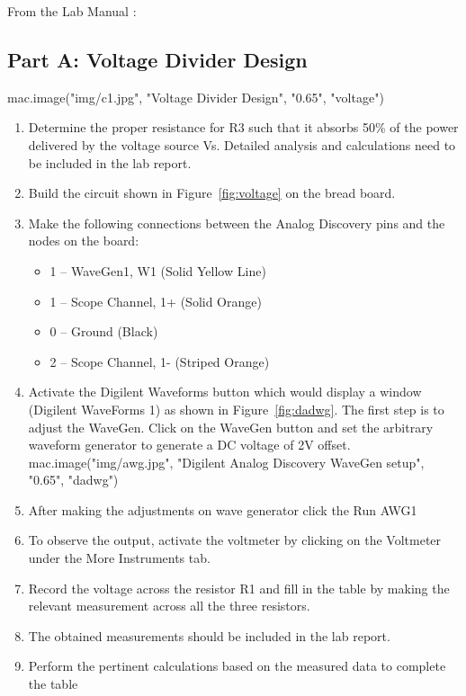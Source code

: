 {%

From the Lab Manual \cite{manual} :
\subsection{Part A: Voltage Divider Design}
\label{sub:Procedure Part A}
{{ mac.image("img/c1.jpg", "Voltage Divider Design", "0.65", "voltage")}}
\begin{enumerate}
  Build a voltage divider that satisfies the given power requirements using the circuit
  given in Figure~\ref{fig:voltage}  Given, R1= 1 kΩ, R2 = 1.5 kΩ.
  \item Determine the proper resistance for R3 such that it absorbs 50\% of the power delivered by
  the voltage source Vs. Detailed analysis and calculations need to be included in the lab
  report.
  \item Build the circuit shown in Figure~\ref{fig:voltage}  on the bread board.
  \item Make the following connections between the Analog Discovery pins and the nodes on the
  board:
  \begin{itemize}
    \item 1 – WaveGen1, W1 (Solid Yellow Line)
    \item 1 – Scope Channel, 1+ (Solid Orange)
    \item 0 – Ground (Black)
    \item 2 – Scope Channel, 1- (Striped Orange)
  \end{itemize}
  \item Activate the Digilent Waveforms button which would display a window (Digilent
  WaveForms 1) as shown in Figure~\ref{fig:dadwg}. The first step is to adjust the WaveGen.
  Click on the WaveGen button and set the arbitrary waveform generator to generate a DC
  voltage of 2V offset.
  {{ mac.image("img/awg.jpg", "Digilent Analog Discovery WaveGen setup", "0.65", "dadwg")}}
  \item After making the adjustments on wave generator click the Run AWG1
  \item To observe the output, activate the voltmeter by clicking on the Voltmeter under the
  More Instruments tab.
  \item Record the voltage across the resistor R1 and fill in the table by making the relevant
  measurement across all the three resistors.
  \item The obtained measurements should be included in the lab report.
  \item Perform the pertinent calculations based on the measured data to complete the table
\end{enumerate}
\vspace{1cm}

}
